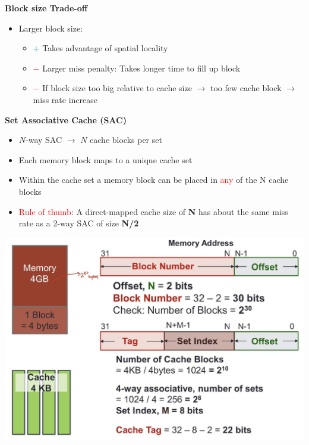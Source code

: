 \documentclass[a4paper]{article} \usepackage[backend=biber, style=numeric, sorting=none]{biblatex}
\begin{document}
\begin{multicols*}{4}
\textbf{{Block size Trade-off}}
\begin{itemize}
\item Larger block size:
\begin{itemize}
    \item \textcolor{teal}{$+$} Takes advantage of spatial locality
    \item \textcolor{red}{$-$} Larger miss penalty: Takes longer time to fill up block
    \item \textcolor{red}{$-$} If block size too big relative to cache size $\rightarrow$ too few cache block $\rightarrow$ miss rate increase\\
\end{itemize}
\end{itemize}

\columnbreak
\textbf{{Set Associative Cache (SAC)}}
\begin{itemize}
\item $N$-way SAC $\rightarrow$ $N$ cache blocks per set
\item Each memory block maps to a unique cache set
\item Within the cache set a memory block can be placed in \textcolor{red}{any} of the N cache blocks
\item \textcolor{red}{Rule of thumb}: A direct-mapped cache size of \textbf{N} has about the same miss rate as a 2-way SAC of size \textbf{N/2}\\
\end{itemize}
\begin{center}
    \includegraphics[scale=0.13]{SAC}
\end{center}


\end{multicols*}
\end{document}
